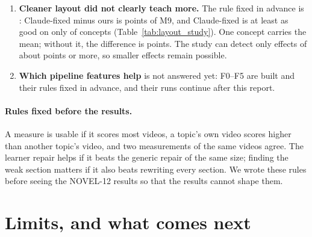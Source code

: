 \documentclass[11pt]{article}
\begin{document}
\begin{enumerate}
  Claude's notes trace \ShiftNotes{} faults to a shift our layout repair inserted (Section~\ref{sec:quality}).
  \item \textbf{Cleaner layout did not clearly teach more.} The rule fixed in advance is \LSGate{}: Claude-fixed minus
  ours is \LSDiff{} points of M9, and Claude-fixed is at least as good on only \LSWins{} of \LSN{} concepts
  (Table~\ref{tab:layout_study}). One concept carries the mean; without it, the difference is \LSDiffWithoutTop{}
  points. The study can detect only effects of about \NMLayoutMDE{} points or more, so smaller effects remain
  possible.
  \item \textbf{Which pipeline features help} is not answered yet: F0--F5 are built and their rules fixed in advance, and their runs
  continue after this report.
\end{enumerate}

\paragraph{Rules fixed before the results.} A measure is usable if it scores most videos, a topic's own video
scores higher than another topic's video, and two measurements of the same videos agree. The learner repair helps if
it beats the generic repair of the same size; finding the weak section matters if it also beats rewriting every
section. We wrote these rules before seeing the NOVEL-12 results so that the results cannot shape them.

\section{Limits, and what comes next}
\end{document}
